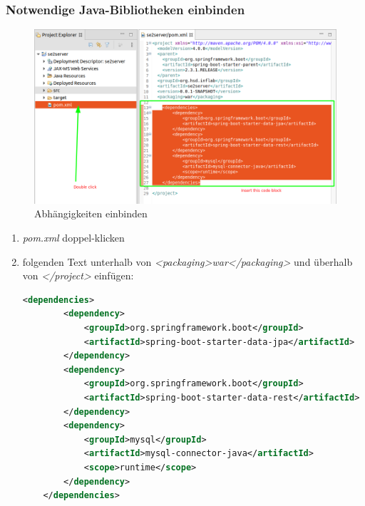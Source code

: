 \documentclass[11pt]{scrartcl}
\begin{document}
\newpage
\subsubsection{Notwendige Java-Bibliotheken einbinden}
\begin{figure}[!ht]
    \includegraphics[width=\linewidth]{images/eclipse11_insert_dependencies.png}
    \caption{Abhängigkeiten einbinden}
    \label{fig:insertdependencies}
\end{figure}

\begin{enumerate}
    \item \textit{pom.xml} doppel-klicken
    \item folgenden Text unterhalb von \textit{<packaging>war</packaging>} und überhalb von
          \textit{</project>} einfügen:
          \begin{lstlisting}[language=XML]
    <dependencies>
        <dependency>
            <groupId>org.springframework.boot</groupId>
            <artifactId>spring-boot-starter-data-jpa</artifactId>
        </dependency>
        <dependency>
            <groupId>org.springframework.boot</groupId>
            <artifactId>spring-boot-starter-data-rest</artifactId>
        </dependency>
        <dependency>
            <groupId>mysql</groupId>
            <artifactId>mysql-connector-java</artifactId>
            <scope>runtime</scope>
        </dependency>
	</dependencies>
    \end{lstlisting}
\end{enumerate}

\newpage
\end{document}
